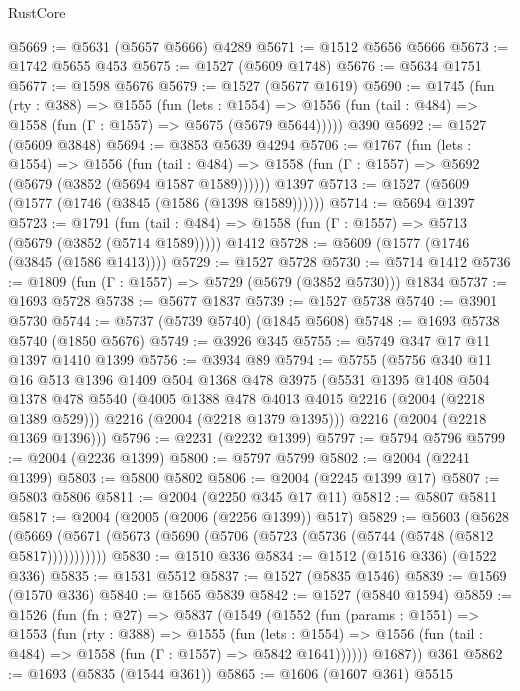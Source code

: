 \begin{lexlean}{RustCore}
\begin{coremodule}
@5669 := @5631 (@5657 @5666) @4289
@5671 := @1512 @5656 @5666
@5673 := @1742 @5655 @453
@5675 := @1527 (@5609 @1748)
@5676 := @5634 @1751
@5677 := @1598 @5676
@5679 := @1527 (@5677 @1619)
@5690 := @1745
    (fun (rty : @388) =>
    @1555
      (fun (lets : @1554) =>
      @1556 (fun (tail : @484) => @1558 (fun (Γ : @1557) => @5675 (@5679 @5644)))))
    @390
@5692 := @1527 (@5609 @3848)
@5694 := @3853 @5639 @4294
@5706 := @1767
    (fun (lets : @1554) =>
    @1556
      (fun (tail : @484) => @1558 (fun (Γ : @1557) => @5692 (@5679 (@3852 (@5694 @1587 @1589))))))
    @1397
@5713 := @1527 (@5609 (@1577 (@1746 (@3845 (@1586 (@1398 @1589))))))
@5714 := @5694 @1397
@5723 := @1791
    (fun (tail : @484) => @1558 (fun (Γ : @1557) => @5713 (@5679 (@3852 (@5714 @1589)))))
    @1412
@5728 := @5609 (@1577 (@1746 (@3845 (@1586 @1413))))
@5729 := @1527 @5728
@5730 := @5714 @1412
@5736 := @1809 (fun (Γ : @1557) => @5729 (@5679 (@3852 @5730))) @1834
@5737 := @1693 @5728
@5738 := @5677 @1837
@5739 := @1527 @5738
@5740 := @3901 @5730
@5744 := @5737 (@5739 @5740) (@1845 @5608)
@5748 := @1693 @5738 @5740 (@1850 @5676)
@5749 := @3926 @345
@5755 := @5749 @347 @17 @11 @1397 @1410 @1399
@5756 := @3934 @89
@5794 := @5755
    (@5756
      @340
      @11
      @16
      @513
      @1396
      @1409
      @504
      @1368
      @478
      @3975
      (@5531
        @1395
        @1408
        @504
        @1378
        @478
        @5540
        (@4005 @1388 @478 @4013 @4015 @2216 (@2004 (@2218 @1389 @529)))
        @2216
        (@2004 (@2218 @1379 @1395)))
      @2216
      (@2004 (@2218 @1369 @1396)))
@5796 := @2231 (@2232 @1399)
@5797 := @5794 @5796
@5799 := @2004 (@2236 @1399)
@5800 := @5797 @5799
@5802 := @2004 (@2241 @1399)
@5803 := @5800 @5802
@5806 := @2004 (@2245 @1399 @17)
@5807 := @5803 @5806
@5811 := @2004 (@2250 @345 @17 @11)
@5812 := @5807 @5811
@5817 := @2004 (@2005 (@2006 (@2256 @1399)) @517)
@5829 := @5603
    (@5628 (@5669 (@5671 (@5673 (@5690 (@5706 (@5723 (@5736 (@5744 (@5748 (@5812 @5817)))))))))))
@5830 := @1510 @336
@5834 := @1512 (@1516 @336) (@1522 @336)
@5835 := @1531 @5512
@5837 := @1527 (@5835 @1546)
@5839 := @1569 (@1570 @336)
@5840 := @1565 @5839
@5842 := @1527 (@5840 @1594)
@5859 := @1526
    (fun (fn : @27) =>
    @5837
      (@1549
        (@1552
          (fun (params : @1551) =>
          @1553
            (fun (rty : @388) =>
            @1555
              (fun (lets : @1554) =>
              @1556 (fun (tail : @484) => @1558 (fun (Γ : @1557) => @5842 @1641))))))
        @1687))
    @361
@5862 := @1693 (@5835 (@1544 @361))
@5865 := @1606 (@1607 @361) @5515

\end{coremodule}
\end{lexlean}
